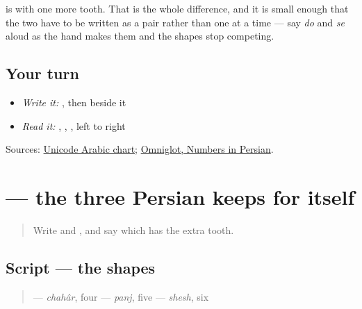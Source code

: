 \textbf{} is \textbf{} with one more tooth. That is the whole difference, and it is small enough that the two have to be written as a pair rather than one at a time — say \emph{do} and \emph{se} aloud as the hand makes them and the shapes stop competing.

\subsection*{Your turn}
\begin{itemize}
\raggedright
  \item \emph{Write it:} \textbf{}, then \textbf{} beside it
  \item \emph{Read it:} \textbf{}, \textbf{}, \textbf{}, left to right
\end{itemize}

\begin{tcolorbox}[breakable,colback=teal!4,colframe=teal!35!black,title={Before you move on}]
Sources: \href{https://www.unicode.org/charts/PDF/U0600.pdf}{Unicode Arabic chart}; \href{https://www.omniglot.com/language/numbers/persian.htm}{Omniglot, Numbers in Persian}.
\end{tcolorbox}
\section[\texorpdfstring{\fa{۴} \fa{۵} \fa{۶} (chahâr panj shesh)}{۴ ۵ ۶ (chahâr panj shesh)}]{   — the three Persian keeps for itself}

\label{lesson:FA-W19-digits-four-five-six}



\begin{quote}
Write \textbf{} and \textbf{}, and say which has the extra tooth.
\end{quote}

\subsection*{Script — the shapes}

\begin{quote}
\textbf{} — \emph{chahâr}, four  \textbf{} — \emph{panj}, five  \textbf{} — \emph{shesh}, six
\end{quote}

